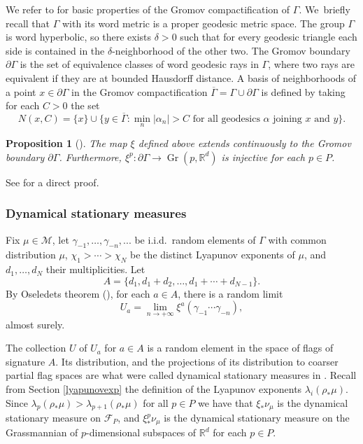 \documentclass[10pt]{amsart}
\let\ts\textstyle
\newtheorem{proposition}[theorem]{Proposition}
\newcommand{\R}{\mathbb{R}}
\newcommand{\F}{\mathcal{F}}
\newcommand{\M}{\mathcal M}
\let\g\gamma
\DeclareMathOperator{\Gr}{Gr}
\begin{document}
We refer to \cite[Chap.\,7]{GdlH90} for basic properties of the Gromov compactification of \(\Gamma\). We~briefly recall that \(\Gamma\) with its word metric is a proper geodesic metric space.
The group \(\Gamma\) is word hyperbolic, so there exists \(\delta > 0\) such that for every geodesic triangle each side is contained in the \(\delta\)-neighborhood of the other two.
The Gromov boundary \(\partial \Gamma\) is the set of equivalence classes of word geodesic rays in \(\Gamma\), where two rays are equivalent if they are at bounded Hausdorff distance.
A basis of neighborhoods of a point \(x \in \partial \Gamma\) in the Gromov compactification \(\overline{\Gamma} = \Gamma \cup \partial \Gamma\) is defined by taking for each \(C > 0\) the set
\[
\ts N(x,C) = \lbrace x\rbrace \cup \lbrace y \in \overline{\Gamma}: \min_{n} |\alpha_n| > C\text{ for all geodesics }\alpha\text{ joining }x\text{ and }y\rbrace.
\]

\begin{proposition}[\cite{GGKW17}]\label{boundarymapstheorem}
The map \(\xi\) defined above extends continuously to the Gromov boundary \(\partial \Gamma\). Furthermore, \(\xi^p:\partial\Gamma \to \Gr(p,\R^d)\) is injective for each \(p \in P\).
\end{proposition}

See \cite[Prop.\,30.3]{canary} for a direct proof.

\subsubsection{Dynamical stationary measures}

Fix \(\mu \in \M\), let \(\g_{-1},\ldots, \g_{-n},..\). be i.i.d.\ random elements of \(\Gamma\) with common distribution \(\mu\), \(\chi_1 > \cdots > \chi_N\) be the distinct Lyapunov exponents of \(\mu\), and \(d_1,\ldots, d_N\) their multiplicities.
Let
\[
A = \lbrace d_1, d_1+d_2,\ldots, d_1+\cdots + d_{N-1} \rbrace.
\]
By Oseledets theorem (\cite{Ose68}), for each \(a \in A\), there is a random limit
\[
U_a = \lim_{n \to +\infty} \xi^a(\g_{-1}\cdots \g_{-n}),
\]
almost surely.

The collection \(U\) of \(U_a\) for \(a \in A\) is a random element in the space of flags of signature \(A\). Its distribution, and the projections of its distribution to coarser partial flag spaces are what were called dynamical stationary measures in \cite{LL23}. Recall from Section \ref{lyapunovexp} the definition of the Lyapunov exponents \(\lambda_i(\rho_*\mu)\). Since \(\lambda_p(\rho_*\mu) > \lambda_{p+1}(\rho_*\mu)\) for all \(p \in P\) we have that \(\xi_*\nu_\mu\) is the dynamical stationary measure on \(\F_P\), and \(\xi^p_*\nu_\mu\) is the dynamical stationary measure on the Grassmannian of \(p\)-dimensional subspaces of \(\R^d\) for each \(p \in P\).
\end{document}
